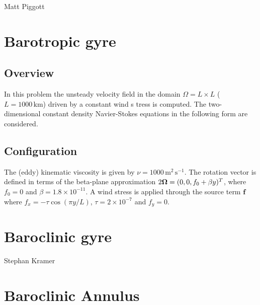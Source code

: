 Matt Piggott



\section{Barotropic gyre}
\label{sect:barotropic_gyre}
\subsection{Overview}
In this problem the unsteady velocity field in the domain $\Omega = L\times L$
($L=1000\,\textrm{km}$) driven by a constant
wind s
tress is computed.
The two-dimensional constant density Navier-Stokes equations in the following form are considered.

\subsection{Configuration}
The (eddy) kinematic viscosity is given by $\nu = 1000\,\textrm{m}^2\,\textrm{s}^{-1}$.
The rotation vector is defined in terms of the beta-plane approximation
$2{\mbox{\boldmath$\Omega$}}=(0,0,f_0 + \beta y)^T$, where $f_0=0$ and $\beta=1.8\times 10^{-11}$.
A wind stress is applied through the source term $\pmb{f}$ where $f_x = -\tau \cos (\pi y/L)$,
$\tau = 2\times 10^{-7}$ and $f_y=0$.



\section{Baroclinic gyre}
\label{sect:baroclinic_gyre}

Stephan Kramer


\section{Baroclinic Annulus}
\label{sect:annulus}

